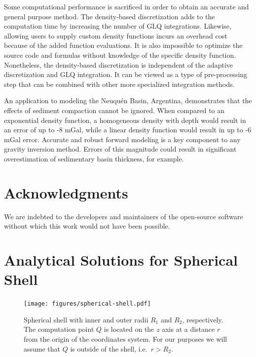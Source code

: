 \documentclass[extra, referee]{gji}
\begin{document}
Some computational performance is sacrificed in order to obtain an accurate and general
purpose method.
The density-based discretization adds to the computation time by increasing
the number of GLQ integrations.
Likewise, allowing users to supply custom density functions incurs an overhead cost
because of the added function evaluations.
It is also impossible to optimize the source code and formulas without knowledge of the
specific density function.
Nonetheless, the density-based discretization is independent of the adaptive
discretization and GLQ integration.
It can be viewed as a type of pre-processing step that can be combined with other more
specialized integration methods.

An application to modeling the Neuqu\'en Basin, Argentina, demonstrates that the effects
of sediment compaction cannot be ignored.
When compared to an exponential density function, a homogeneous density with depth would
result in an error of up to -8 mGal, while a linear density function would result in up
to -6 mGal error.
Accurate and robust forward modeling is a key component to any gravity inversion method.
Errors of this magnitude could result in significant overestimation of sedimentary
basin thickness, for example.




\section{Acknowledgments}

We are indebted to the developers and maintainers of the open-source software without
which this work would not have been possible.





\appendix

\section{Analytical Solutions for Spherical Shell}
\label{sec:shell}

\begin{figure}
\centering
\texttt{[image: figures/spherical-shell.pdf]}
\caption{
    Spherical shell with inner and outer radii $R_1$ and $R_2$, respectively.
    The computation point $Q$ is located on the $z$ axis at a distance $r$ from
    the origin of the coordinates system.
    For our purposes we will assume that $Q$ is outside of the shell,
    i.e.~$r > R_2$.
}
\label{fig:spherical-shell}
\end{figure}
\end{document}
